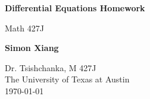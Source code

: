 \documentclass{article}
\begin{document}
\begin{titlepage}
    \begin{center}
        \vspace*{1cm}
 
        \Huge
        \textbf{Differential Equations Homework}
 
        \vspace{0.5cm}
        \LARGE
        Math 427J

        \vspace{1.5cm}
 
        \textbf{Simon Xiang}
 
        \vfill
  
        \vspace{0.8cm}
 
        \Large
    	Dr. Tsishchanka, M 427J\\
        The University of Texas at Austin\\
        \today
 
    \end{center}
\end{titlepage}
    
\end{document}
